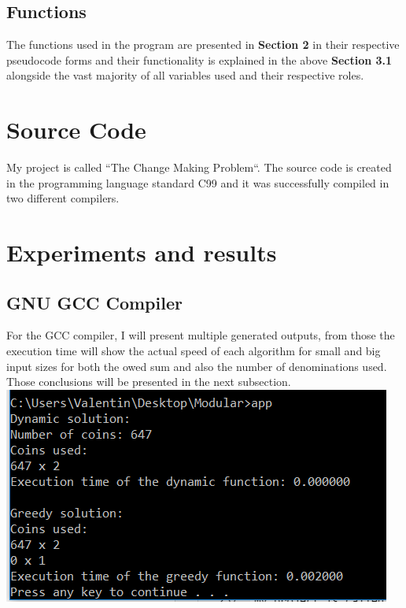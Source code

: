 \documentclass[12]{article}
\begin{document}
\subsection{Functions}
\textcolor{white}{}

The functions used in the program are presented in \textbf{Section 2} in their respective pseudocode forms and their functionality is explained in the above \textbf{Section 3.1} alongside the vast majority of all variables used and their respective roles.

\newpage
\section{Source Code}
\textcolor{white}{}


My project is called ``The Change Making Problem``. The source code is created in the programming language standard C99 and it was successfully compiled in two different compilers.

\section{Experiments and results}

\subsection{GNU GCC Compiler}
For the GCC compiler, I will present multiple generated outputs, from those the execution time will show the actual speed of each algorithm for small and big input sizes for both the owed sum and also the number of denominations used. Those conclusions will be presented in the next subsection.
\\

\includegraphics[scale=0.6]{gcc-1.png}
\\
\end{document}
